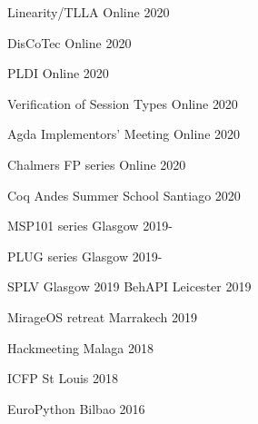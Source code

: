 \documentclass[11pt, a4paper]{awesome-cv}
\begin{document}
\begin{minipage}[t]{0.5\linewidth}
\begin{cvhonors}
  \cvhonor
  {Linearity/TLLA}
  {}
  {Online}
  {2020}

  \cvhonor
  {DisCoTec}
  {}
  {Online}
  {2020}

  \cvhonor
  {PLDI}
  {}
  {Online}
  {2020}

  \cvhonor
  {Verification of Session Types}
  {}
  {Online}
  {2020}

  \cvhonor
  {Agda Implementors' Meeting}
  {}
  {Online}
  {2020}

  \cvhonor
  {Chalmers FP series}
  {}
  {Online}
  {2020}

    \cvhonor
      {Coq Andes Summer School}
      {}
      {Santiago}
      {2020}

      \cvhonor
      {MSP101 series}
      {}
      {Glasgow}
      {2019-}
\end{cvhonors}
\end{minipage}
\hspace{0.05\linewidth}
\begin{minipage}[t]{0.5\linewidth}
\begin{cvhonors}

      \cvhonor
      {PLUG series}
      {}
      {Glasgow}
      {2019-}

      \cvhonor
      {SPLV}
      {}
      {Glasgow}
      {2019}
    \cvhonor
      {BehAPI}
      {}
      {Leicester}
      {2019}

    \cvhonor
      {MirageOS retreat}
      {}
      {Marrakech}
      {2019}

    \cvhonor
      {Hackmeeting}
      {}
      {Malaga}
      {2018}

    \cvhonor
      {ICFP}
      {}
      {St Louis}
      {2018}

    \cvhonor
      {EuroPython}
      {}
      {Bilbao}
      {2016}

\end{cvhonors}
\end{minipage}
\end{document}

